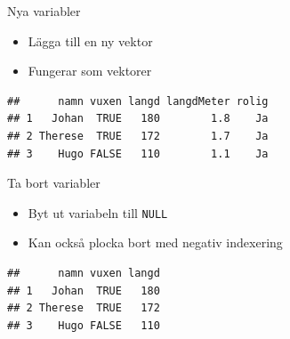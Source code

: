 \documentclass[
  11pt,
  ignorenonframetext,
]{beamer}
\newenvironment{Shaded}{\begin{snugshade}}{\end{snugshade}}
\newcommand{\ConstantTok}[1]{\textcolor[rgb]{0.56,0.35,0.01}{#1}}
\newcommand{\DecValTok}[1]{\textcolor[rgb]{0.00,0.00,0.81}{#1}}
\newcommand{\FloatTok}[1]{\textcolor[rgb]{0.00,0.00,0.81}{#1}}
\newcommand{\FunctionTok}[1]{\textcolor[rgb]{0.13,0.29,0.53}{\textbf{#1}}}
\newcommand{\NormalTok}[1]{#1}
\newcommand{\OtherTok}[1]{\textcolor[rgb]{0.56,0.35,0.01}{#1}}
\newcommand{\SpecialCharTok}[1]{\textcolor[rgb]{0.81,0.36,0.00}{\textbf{#1}}}
\newcommand{\StringTok}[1]{\textcolor[rgb]{0.31,0.60,0.02}{#1}}
\providecommand{\tightlist}{%
  \setlength{\itemsep}{0pt}\setlength{\parskip}{0pt}}
\begin{document}
\begin{frame}[fragile]{Nya variabler}
\label{nya-variabler}
\begin{itemize}
\tightlist
\item
  Lägga till en ny vektor
\item
  Fungerar som vektorer
\end{itemize}

\begin{Shaded}
\end{Shaded}

\begin{verbatim}
##      namn vuxen langd langdMeter rolig
## 1   Johan  TRUE   180        1.8    Ja
## 2 Therese  TRUE   172        1.7    Ja
## 3    Hugo FALSE   110        1.1    Ja
\end{verbatim}
\end{frame}

\begin{frame}[fragile]{Ta bort variabler}
\label{ta-bort-variabler}
\begin{itemize}
\tightlist
\item
  Byt ut variabeln till \texttt{NULL}
\item
  Kan också plocka bort med negativ indexering
\end{itemize}

\begin{Shaded}
\end{Shaded}

\begin{verbatim}
##      namn vuxen langd
## 1   Johan  TRUE   180
## 2 Therese  TRUE   172
## 3    Hugo FALSE   110
\end{verbatim}
\end{frame}
\end{document}

